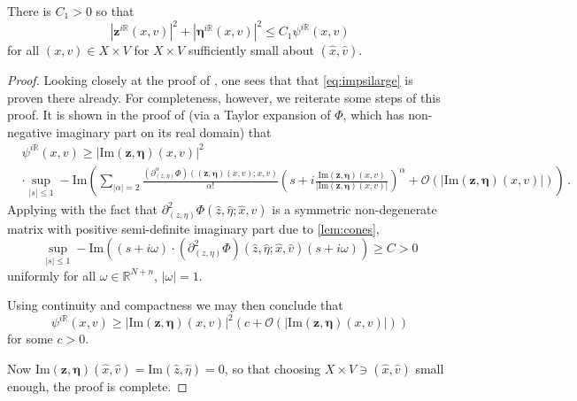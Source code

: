 \documentclass[
	fontsize=11pt, 
	twoside=false, 
	abstract=true, 
	a4paper,
]{scrartcl}
\newcommand{\RR}{\mathbb{R}}
\newcommand{\abs}[1]{\left\lvert#1\right\rvert}
\newcommand{\del}{\partial}
\begin{document}
\begin{lemma}[{\cite[Lem.~5.14]{2306.05906v1}}]\label{lem:impsilarge}
	There is $C_1>0$ so that
	\begin{equation}\label{eq:impsilarge}
		\abs{\mathbf{z}^{i\RR}(x,v)}^2 + \abs{\bm{\eta}^{i\RR}(x,v)}^2 \leq C_1\psi^{i\RR}(x,v)
	\end{equation}
	for all $(x,v) \in X\times V$ for $X\times V$ sufficiently small about $(\hat x,\hat v)$.
\end{lemma}
\begin{proof}
	Looking closely at the proof of \cite[Lem.~5.14]{2306.05906v1}, one sees that that \cref{eq:impsilarge} is proven there already. For completeness, however, we reiterate some steps of this proof. It is shown in the proof of \cite[Lem.~5.14]{2306.05906v1} (via a Taylor expansion of $\Phi$, which has non-negative imaginary part on its real domain) that
	\begin{align*}
		&{}\psi^{i\RR}(x,v)\geq \abs{\mathrm{Im}(\mathbf{z},\bm{\eta})(x,v)}^2 \\
		&\cdot\sup_{\abs{s}\leq 1} - \mathrm{Im} \left(\sum_{\abs{\alpha}=2}\frac{\left(\del_{(z,\eta)}^\alpha \Phi\right)((\mathbf{z},\bm{\eta})(x,v);x,v)}{\alpha!}\left(s+i \frac{\mathrm{Im}(\mathbf{z},\bm{\eta})(x,v)}{\abs{\mathrm{Im}(\mathbf{z},\bm{\eta})(x,v)}}\right)^\alpha + \mathcal{O}(\abs{\mathrm{Im}(\mathbf{z},\bm{\eta})(x,v)})\right)\,.
	\end{align*}
	Applying \cite[Lem.~7.7.9]{hoermander1} with the fact that $\del_{(z,\eta)}^2\Phi(\hat z,\hat \eta;\hat x,\hat v)$ is a symmetric non-degenerate matrix with positive semi-definite imaginary part due to \cref{lem:cones},
	\[
		\sup_{\abs{s}\leq 1} - \mathrm{Im}\left(\left(s+i\omega\right)\cdot\left(\del_{(z,\eta)}^2 \Phi\right)(\hat z, \hat\eta;\hat x,\hat v)\left(s+i\omega\right)\right) \geq C>0
	\]
	uniformly for all $\omega\in \RR^{N+n}$, $\abs{\omega}=1$.

	Using continuity and compactness we may then conclude that
	\[
		\psi^{i\RR}(x,v)\geq \abs{\mathrm{Im}(\mathbf{z},\bm{\eta})(x,v)}^2 (c + \mathcal{O}(\abs{\mathrm{Im}(\mathbf{z},\bm{\eta})(x,v)})) 
	\]
	for some $c>0$. 

	Now $\mathrm{Im}(\mathbf{z},\bm{\eta})(\hat x,\hat v) = \mathrm{Im}(\hat z,\hat \eta) = 0$, so that choosing $X\times V \ni (\hat x,\hat v)$ small enough, the proof is complete.
\end{proof}
\end{document}

